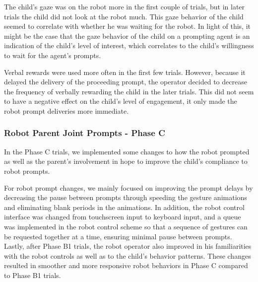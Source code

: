 \documentclass{ut-thesis}
\begin{document}
The child's gaze was on the robot more in the first couple of trials, but in later trials the child did not look at the robot much.  This gaze behavior of the child seemed to correlate with whether he was waiting for the robot.  In light of this, it might be the case that the gaze behavior of the child on a prompting agent is an indication of the child's level of interest, which correlates to the child's willingness to wait for the agent's prompts.

Verbal rewards were used more often in the first few trials.  However, because it delayed the delivery of the proceeding prompt, the operator decided to decrease the frequency of verbally rewarding the child in the later trials.  This did not seem to have a negative effect on the child's level of engagement, it only made the robot prompt deliveries more immediate.

\subsubsection{Robot Parent Joint Prompts - Phase C}
In the Phase C trials, we implemented some changes to how the robot prompted as well as the parent's involvement in hope to improve the child's compliance to robot prompts.

For robot prompt changes, we mainly focused on improving the prompt delays by decreasing the pause between prompts through speeding the gesture animations and eliminating blank periods in the animations.  In addition, the robot control interface was changed from touchscreen input to keyboard input, and a queue was implemented in the robot control scheme so that a sequence of gestures can be requested together at a time, ensuring minimal pause between prompts.  Lastly, after Phase B1 trials, the robot operator also improved in his familiarities with the robot controls as well as to the child's behavior patterns.  These changes resulted in smoother and more responsive robot behaviors in Phase C compared to Phase B1 trials.
\end{document}
